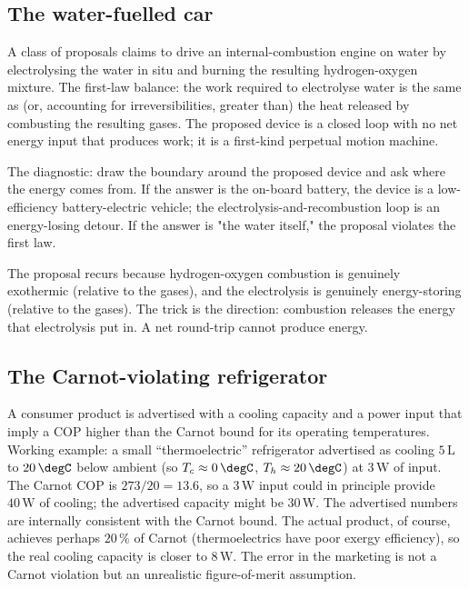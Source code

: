 \subsection{The water-fuelled car}

A class of proposals claims to drive an internal-combustion engine on
water by electrolysing the water in situ and burning the resulting
hydrogen-oxygen mixture. The first-law balance: the work required to
electrolyse water is the same as (or, accounting for irreversibilities,
greater than) the heat released by combusting the resulting gases. The
proposed device is a closed loop with no net energy input that
produces work; it is a first-kind perpetual motion machine.

The diagnostic: draw the boundary around the proposed device and ask
where the energy comes from. If the answer is the on-board battery,
the device is a low-efficiency battery-electric vehicle; the
electrolysis-and-recombustion loop is an energy-losing detour. If
the answer is "the water itself," the proposal violates the first
law.

The proposal recurs because hydrogen-oxygen combustion is genuinely
exothermic (relative to the gases), and the electrolysis is
genuinely energy-storing (relative to the gases). The trick is the
direction: combustion releases the energy that electrolysis put in.
A net round-trip cannot produce energy.

\subsection{The Carnot-violating refrigerator}

A consumer product is advertised with a cooling capacity and a power
input that imply a COP higher than the Carnot bound for its
operating temperatures. Working example: a small ``thermoelectric''
refrigerator advertised as cooling $5\,\text{L}$ to $20\,\degC$ below
ambient (so $T_c \approx 0\,\degC$, $T_h \approx 20\,\degC$) at
$3\,\text{W}$ of input. The Carnot COP is $273/20 = 13.6$, so a
$3\,\text{W}$ input could in principle provide $40\,\text{W}$ of
cooling; the advertised capacity might be $30\,\text{W}$. The
advertised numbers are internally consistent with the Carnot bound.
The actual product, of course, achieves perhaps $20\,\%$ of Carnot
(thermoelectrics have poor exergy efficiency), so the real cooling
capacity is closer to $8\,\text{W}$. The error in the marketing is
not a Carnot violation but an unrealistic figure-of-merit assumption.

